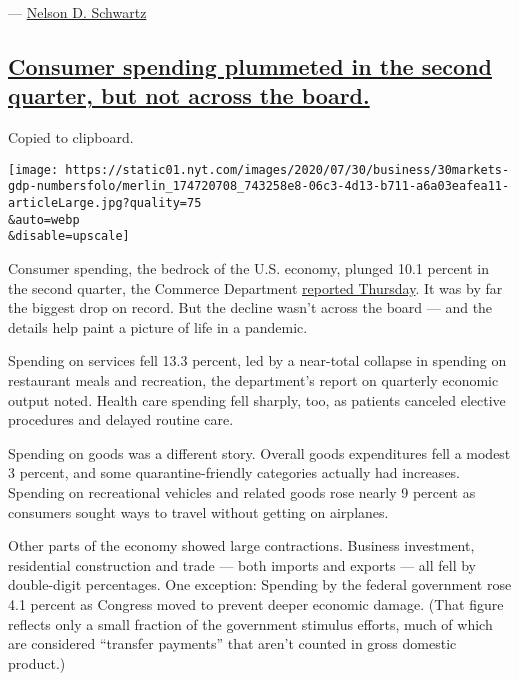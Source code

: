 --- \href{https://www.nytimes.com/by/nelson-d-schwartz}{Nelson D.
Schwartz}

\hypertarget{consumer-spending-plummeted-in-the-second-quarter-but-not-across-the-board}{%
\subsection{\texorpdfstring{\protect\hyperlink{consumer-spending-plummeted-in-the-second-quarter-but-not-across-the-board}{Consumer
spending plummeted in the second quarter, but not across the
board.}}{Consumer spending plummeted in the second quarter, but not across the board.}}\label{consumer-spending-plummeted-in-the-second-quarter-but-not-across-the-board}}

Copied to clipboard.

\texttt{[image: https://static01.nyt.com/images/2020/07/30/business/30markets-gdp-numbersfolo/merlin\_174720708\_743258e8-06c3-4d13-b711-a6a03eafea11-articleLarge.jpg?quality=75\\\&auto=webp\\\&disable=upscale]}

Consumer spending, the bedrock of the U.S. economy, plunged 10.1 percent
in the second quarter, the Commerce Department
\href{https://www.bea.gov/sites/default/files/2020-07/gdp2q20_adv.pdf}{reported
Thursday}. It was by far the biggest drop on record. But the decline
wasn't across the board --- and the details help paint a picture of life
in a pandemic.

Spending on services fell 13.3 percent, led by a near-total collapse in
spending on restaurant meals and recreation, the department's report on
quarterly economic output noted. Health care spending fell sharply, too,
as patients canceled elective procedures and delayed routine care.

Spending on goods was a different story. Overall goods expenditures fell
a modest 3 percent, and some quarantine-friendly categories actually had
increases. Spending on recreational vehicles and related goods rose
nearly 9 percent as consumers sought ways to travel without getting on
airplanes.

Other parts of the economy showed large contractions. Business
investment, residential construction and trade --- both imports and
exports --- all fell by double-digit percentages. One exception:
Spending by the federal government rose 4.1 percent as Congress moved to
prevent deeper economic damage. (That figure reflects only a small
fraction of the government stimulus efforts, much of which are
considered ``transfer payments'' that aren't counted in gross domestic
product.)

